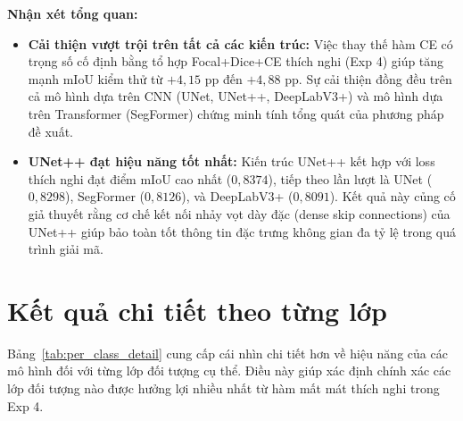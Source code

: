 \noindent\textbf{Nhận xét tổng quan:}
\begin{itemize}[leftmargin=1.4cm]
  \item \textbf{Cải thiện vượt trội trên tất cả các kiến trúc:} Việc thay thế hàm CE có trọng số cố định bằng tổ hợp Focal+Dice+CE thích nghi (Exp 4) giúp tăng mạnh mIoU kiểm thử từ $+4{,}15$ pp đến $+4{,}88$ pp. Sự cải thiện đồng đều trên cả mô hình dựa trên CNN (UNet, UNet++, DeepLabV3+) và mô hình dựa trên Transformer (SegFormer) chứng minh tính tổng quát của phương pháp đề xuất.
  \item \textbf{UNet++ đạt hiệu năng tốt nhất:} Kiến trúc UNet++ kết hợp với loss thích nghi đạt điểm mIoU cao nhất ($0{,}8374$), tiếp theo lần lượt là UNet ($0{,}8298$), SegFormer ($0{,}8126$), và DeepLabV3+ ($0{,}8091$). Kết quả này củng cố giả thuyết rằng cơ chế kết nối nhảy vọt dày đặc (dense skip connections) của UNet++ giúp bảo toàn tốt thông tin đặc trưng không gian đa tỷ lệ trong quá trình giải mã.
\end{itemize}

\section{Kết quả chi tiết theo từng lớp}
\label{sec:per_class}

Bảng~\ref{tab:per_class_detail} cung cấp cái nhìn chi tiết hơn về hiệu năng của các mô hình đối với từng lớp đối tượng cụ thể. Điều này giúp xác định chính xác các lớp đối tượng nào được hưởng lợi nhiều nhất từ hàm mất mát thích nghi trong Exp 4.

